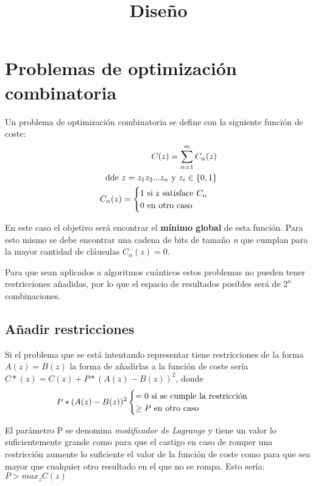 \documentclass{article}
\title{Diseño}
\begin{document}
\maketitle{}

\section{Problemas de optimización combinatoria}

Un problema de optimización combinatoria se define con la siguiente función de coste:
\begin{align*}
  C(z) = \sum_{\alpha = 1}^{m} C_\alpha(z) \\
  \textnormal{ dde } z = z_1z_2...z_n \textnormal{ y } z_i\in \{0, 1\} \\
   C_{\alpha}(z) = \begin{cases}
     1 \textnormal{ si z satisface } C_\alpha \\
     0 \textnormal{ en otro caso}
   \end{cases}
\end{align*}

En este caso el objetivo será encontrar el \textbf{mínimo global} de esta función. Para esto mismo se debe encontrar una cadena de bits de tamaño \textit{n} que cumplan para la mayor cantidad de cláusulas $C_\alpha(z) = 0$.

Para que sean aplicados a algoritmos cuánticos estos problemas no pueden tener restricciones añadidas, por lo que el espacio de resultados posibles será de $2^n$ combinaciones.

\subsection{Añadir restricciones}

Si el problema que se está intentando representar tiene restricciones de la forma $A(z) = B(z)$ la forma de añadirlas a la función de coste sería $C*(z) = C(z) + P*(A(z)-B(z))^2$, donde
\begin{align*}
  P*(A(z) - B(z))^2 \begin{cases}
    = 0 \textnormal{ si se cumple la restricción } \\
    \ge P \textnormal{ en otro caso }
  \end{cases}
\end{align*}

El parámetro P se denomina \textit{modificador de Lagrange} y tiene un valor lo suficientemente grande como para que el castigo en caso de romper una restricción aumente lo suficiente el valor de la función de coste como para que sea mayor que cualquier otro resultado en el que no se rompa. Esto sería: $P > max_zC(z)$
\end{document}

